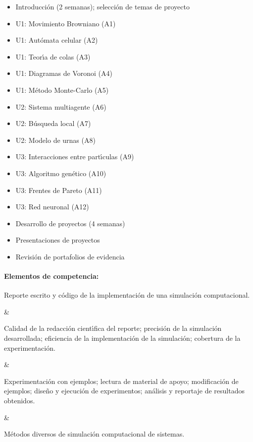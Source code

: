 \begin{itemize}[itemsep=-3pt]
\item{Introducci\'{o}n (2 semanas); selecci\'{o}n de temas de
  proyecto}
\item{U1: Movimiento Browniano (A1)}
\item{U1: Aut\'{o}mata celular (A2)}
\item{U1: Teor\'{\i}a de colas (A3)}
\item{U1: Diagramas de Voronoi (A4)}
\item{U1: M\'{e}todo Monte-Carlo (A5)}
\item{U2: Sistema multiagente (A6)}
\item{U2: B\'{u}squeda local (A7)}
\item{U2: Modelo de urnas (A8)}
\item{U3: Interacciones entre part\'{\i}culas (A9)}
\item{U3: Algoritmo gen\'{e}tico (A10)}
\item{U3: Frentes de Pareto (A11)}
\item{U3: Red neuronal (A12)}
\item{Desarrollo de proyectos (4 semanas)}  
\item{Presentaciones de proyectos}
\item{Revisi\'{o}n de portafolios de evidencia}
\end{itemize}

\newpage

\paragraph{Elementos de competencia:}

\quad



Reporte escrito y c\'{o}digo de la implementaci\'{o}n de una
simulaci\'{o}n computacional.

&

Calidad de la redacci\'{o}n cient\'{\i}fica del reporte; 
precisi\'{o}n de la simulaci\'{o}n desarrollada;
eficiencia de la implementaci\'{o}n de la simulaci\'{o}n;
cobertura de la experimentaci\'{o}n.

&

Experimentaci\'{o}n con ejemplos; lectura de material de apoyo;
modificaci\'{o}n de ejemplos; dise\~{n}o y ejecuci\'{o}n de experimentos;
an\'{a}lisis y reportaje de resultados obtenidos.

&

M\'{e}todos diversos de simulaci\'{o}n computacional de sistemas.

